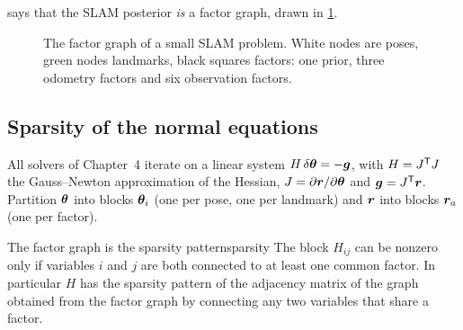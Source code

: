  says that the SLAM posterior \emph{is} a factor
graph, drawn in \cref{fig:fg}.

\begin{figure}[ht]
\centering
{}
\caption{The factor graph of a small SLAM problem. White nodes are poses,
green nodes landmarks, black squares factors: one prior, three odometry
factors and six observation factors.}
\label{fig:fg}
\end{figure}

\subsection{Sparsity of the normal equations}

All solvers of Chapter~4 iterate on a linear system
$H\,\delta\bm{\theta}=-\bm{g}$, with $H=J^{\mathsf{T}} J$ the Gauss--Newton
approximation of the Hessian, $J=\partial\bm{r}/\partial\bm{\theta}$ and
$\bm{g}=J^{\mathsf{T}}\bm{r}$. Partition $\bm{\theta}$ into blocks $\bm{\theta}_i$ (one
per pose, one per landmark) and $\bm{r}$ into blocks $\bm{r}_a$ (one
per factor).

\begin{proposition}{The factor graph is the sparsity pattern}{sparsity}
The block $H_{ij}$ can be nonzero only if variables $i$ and $j$ are both
connected to at least one common factor. In particular $H$ has the
sparsity pattern of the adjacency matrix of the graph obtained from the
factor graph by connecting any two variables that share a factor.
\end{proposition}

